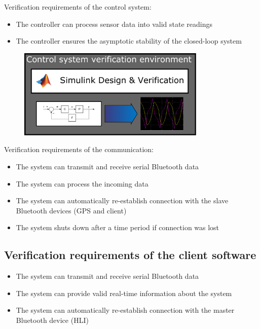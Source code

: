 Verification requirements of the control system:

\begin{itemize}

\item The controller can process sensor data into valid state readings
\item The controller ensures the asymptotic stability of the closed-loop system 

\end{itemize}

\begin{figure}[H]
	\centering
	\includegraphics[width=0.8\textwidth]{img2/SimVer}
	\caption{}
	\label{}
\end{figure}

Verification requirements of the communication:

\begin{itemize}

\item The system can transmit and receive serial Bluetooth data
\item The system can process the incoming data
\item The system can automatically re-establish connection with the slave Bluetooth devices (GPS and client)
\item The system shuts down after a time period if connection was lost

\end{itemize}

\subsection{Verification requirements of the client software}

\begin{itemize}

\item The system can transmit and receive serial Bluetooth data
\item The system can provide valid real-time information about the system
\item The system can automatically re-establish connection with the master Bluetooth device (HLI)

\end{itemize}

